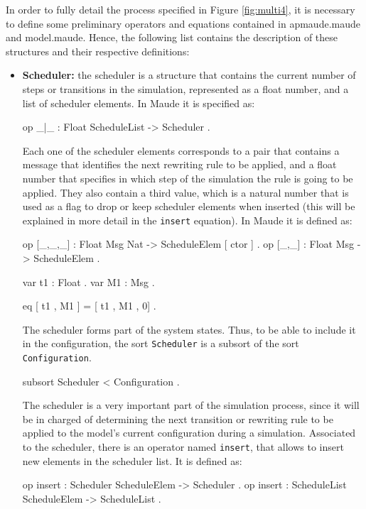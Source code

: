 In order to fully detail the process specified in Figure \ref{fig:multi4}, it is necessary to define some preliminary operators and equations contained in apmaude.maude and model.maude. Hence, the following list contains the description of these structures and their respective definitions:
\begin{itemize}
    \item \textbf{Scheduler:} the scheduler is a structure that contains the current number of steps or transitions in the simulation, represented as a float number, and a list of scheduler elements. In Maude it is specified as:
    \begin{maude}

op {_|_} : Float ScheduleList -> Scheduler . \end{maude}
    Each one of the scheduler elements corresponds to a pair that contains a message that identifies the next rewriting rule to be applied, and a float number that specifies in which step of the simulation the rule is going to be applied. They also contain a third value, which is a natural number that is used as a flag to drop or keep scheduler elements when inserted (this will be explained in more detail in the \texttt{insert} equation). In Maude it is defined as:
    \begin{maude}
    
op [_,_,_] : Float Msg Nat -> ScheduleElem [ ctor ] .
op [_,_] : Float Msg -> ScheduleElem .

var t1 : Float .
var M1 : Msg .

eq [ t1 , M1 ] = [ t1 , M1 , 0] . \end{maude}
    The scheduler forms part of the system states. Thus, to be able to include it in the configuration, the sort \texttt{Scheduler} is a subsort of the sort \texttt{Configuration}.
    \begin{maude}
    
subsort Scheduler < Configuration . \end{maude}
    
    The scheduler is a very important part of the simulation process, since it will be in charged of determining the next transition or rewriting rule to be applied to the model's current configuration during a simulation. Associated to the scheduler, there is an operator named \texttt{insert}, that allows to insert new elements in the scheduler list. It is defined as:
    \begin{maude}
    
op insert : Scheduler ScheduleElem -> Scheduler .
op insert : ScheduleList ScheduleElem -> ScheduleList .  


\end{maude}
\end{itemize}
